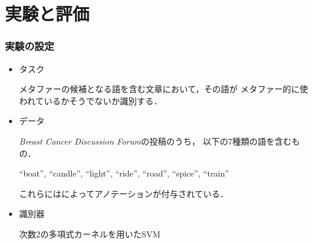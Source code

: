 \documentclass[11pt,usepdftitle=false]{beamer}
\newcommand\papertitle[1]{\textit{#1}}
\let\oldcite=\citet
\renewcommand\citet[1]{\hyperlink{#1}{\oldcite{#1}}}
\begin{document}
\section{実験と評価}
\begin{frame}
    \frametitle{実験の設定}
    \setlength{\leftmargini}{1.3em}
    \begin{itemize}
        \item タスク

            メタファーの候補となる語を含む文章において，その語が
            メタファー的に使われているかそうでないか識別する．

        \item データ

            \papertitle{Breast Cancer Discussion Forum}の投稿のうち，
            以下の7種類の語を含むもの．
            \begin{center}
               “boat”, “candle”, “light”, “ride”, “road”, “spice”, “train”
            \end{center}
            これらには\citet{jang2015}によってアノテーションが付与されている．

        \item 識別器

            次数2の多項式カーネルを用いたSVM

    \end{itemize}
\end{frame}
\end{document}
